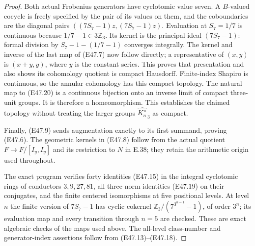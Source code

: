 \begin{proof}
Both actual Frobenius generators have cyclotomic
value seven. A $B$-valued cocycle is freely
specified by the pair of its values on them,
and the coboundaries are the diagonal pairs
$((7S_7-1)z,(7S_7-1)z)$. Evaluation at
$S_7=1/7$ is continuous because $1/7-1\in3\mathbb Z_3$.
Its kernel is the principal ideal $(7S_7-1)$:
formal division by $S_7-1-(1/7-1)$ converges
integrally. The kernel and inverse of the
last map of (E47.7) now follow directly; a
representative of $(x,y)$ is $(x+y,y)$,
where $y$ is the constant series. This
proves that presentation and also shows its
cohomology quotient is compact Hausdorff.
Finite-index Shapiro is continuous, so the
annular cohomology has this compact topology.
The natural map to (E47.20) is a continuous
bijection onto an inverse limit of compact
three-unit groups. It is therefore a
homeomorphism. This establishes the claimed
topology without treating the larger groups
$\widehat{K_n^\times}_3$ as compact.

Finally, (E47.9) sends augmentation exactly
to its first summand, proving (E47.6).
The geometric kernels in (E47.8) follow from
the actual quotient $F\to F/[I_y,I_y]$
and its restriction to $N$ in E.38; they
retain the arithmetic origin used throughout.

The exact program verifies forty identities
(E47.15) in the integral cyclotomic rings
of conductors $3,9,27,81$, all three norm
identities (E47.19) on their conjugates,
and the finite centered isomorphisms at five
positional levels. At level $n$ the finite
version of $7S_7-1$ has cyclic cokernel
$\mathbb Z_3/(7^{3^{n-1}}-1)$, of order
$3^n$; its evaluation map and every
transition through $n=5$ are checked.
These are exact algebraic checks of the
maps used above. The all-level class-number
and generator-index assertions follow from
(E47.13)--(E47.18).
\end{proof}
